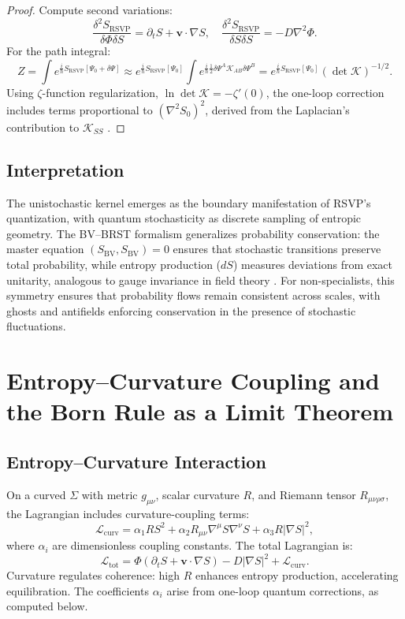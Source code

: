 \documentclass[12pt]{article}
\begin{document}
\begin{proof}
Compute second variations:
\[
\frac{\delta^2 S_{\mathrm{RSVP}}}{\delta \Phi \delta S} = \partial_t S + \mathbf{v} \cdot \nabla S, \quad \frac{\delta^2 S_{\mathrm{RSVP}}}{\delta S \delta S} = -D \nabla^2 \Phi.
\]
For the path integral:
\[
Z = \int e^{\frac{i}{\hbar} S_{\mathrm{RSVP}}[\Psi_0 + \delta \Psi]} \approx e^{\frac{i}{\hbar} S_{\mathrm{RSVP}}[\Psi_0]} \int e^{\frac{i}{\hbar} \frac{1}{2} \delta \Psi^A \mathcal{K}_{AB} \delta \Psi^B} = e^{\frac{i}{\hbar} S_{\mathrm{RSVP}}[\Psi_0]} (\det \mathcal{K})^{-1/2}.
\]
Using \(\zeta\)-function regularization, \(\ln \det \mathcal{K} = -\zeta'(0)\), the one-loop correction includes terms proportional to \((\nabla^2 S_0)^2\), derived from the Laplacian’s contribution to \(\mathcal{K}_{S S}\) \cite{Pantev2013}.
\end{proof}

\subsection{Interpretation}

The unistochastic kernel emerges as the boundary manifestation of RSVP’s quantization, with quantum stochasticity as discrete sampling of entropic geometry. The BV–BRST formalism generalizes probability conservation: the master equation \((S_{\mathrm{BV}}, S_{\mathrm{BV}}) = 0\) ensures that stochastic transitions preserve total probability, while entropy production (\(dS\)) measures deviations from exact unitarity, analogous to gauge invariance in field theory \cite{Alexandrov1997}. For non-specialists, this symmetry ensures that probability flows remain consistent across scales, with ghosts and antifields enforcing conservation in the presence of stochastic fluctuations.

\section{Entropy–Curvature Coupling and the Born Rule as a Limit Theorem}

\subsection{Entropy–Curvature Interaction}

On a curved \(\Sigma\) with metric \(g_{\mu\nu}\), scalar curvature \(R\), and Riemann tensor \(R_{\mu\nu\rho\sigma}\), the Lagrangian includes curvature-coupling terms:
\[
\mathcal{L}_{\text{curv}} = \alpha_1 R S^2 + \alpha_2 R_{\mu\nu} \nabla^\mu S \nabla^\nu S + \alpha_3 R |\nabla S|^2,
\]
where \(\alpha_i\) are dimensionless coupling constants. The total Lagrangian is:
\[
\mathcal{L}_{\text{tot}} = \Phi (\partial_t S + \mathbf{v} \cdot \nabla S) - D |\nabla S|^2 + \mathcal{L}_{\text{curv}}.
\]
Curvature regulates coherence: high \(R\) enhances entropy production, accelerating equilibration. The coefficients \(\alpha_i\) arise from one-loop quantum corrections, as computed below.
\end{document}
